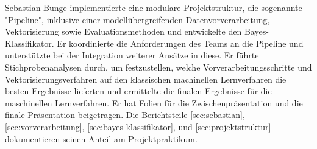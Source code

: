 \label{sec:sebastian}
Sebastian Bunge implementierte eine modulare Projektstruktur, die sogenannte "Pipeline", inklusive einer modellübergreifenden Datenvorverarbeitung, Vektorisierung sowie Evaluationsmethoden und entwickelte den Bayes-Klassifikator. Er koordinierte die Anforderungen des Teams an die Pipeline und unterstützte bei der Integration weiterer Ansätze in diese. Er führte Stichprobenanalysen durch, um festzustellen, welche Vorverarbeitungsschritte und Vektorisierungsverfahren auf den klassischen machinellen Lernverfahren die besten Ergebnisse lieferten und ermittelte die finalen Ergebnisse für die maschinellen Lernverfahren. Er hat Folien für die Zwischenpräsentation und die finale Präsentation beigetragen. Die Berichtsteile \ref{sec:sebastian}, \ref{sec:vorverarbeitung}, \ref{sec:bayes-klassifikator}, und \ref{sec:projektstruktur} dokumentieren seinen Anteil am Projektpraktikum.
